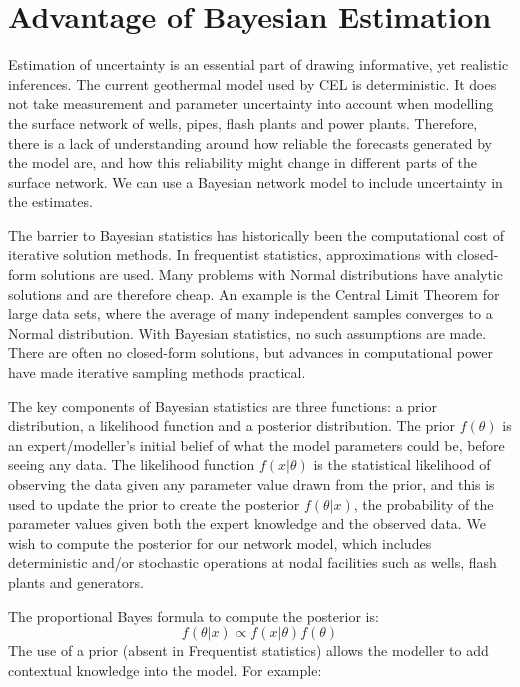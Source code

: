 \documentclass[a4paper, 12pt]{article}
\begin{document}
\section{Advantage of Bayesian Estimation}
Estimation of uncertainty is an essential part of drawing informative, yet realistic inferences. The current geothermal model used by CEL is deterministic. It does not take  measurement and parameter uncertainty into account when modelling the surface network of wells, pipes, flash plants and power plants. Therefore, there is a lack of understanding around how reliable the forecasts generated by the model are, and how this reliability might change in different parts of the surface network. We can use a Bayesian network model to include uncertainty in the estimates.

The barrier to Bayesian statistics has historically been the computational cost of iterative solution methods. In frequentist statistics, approximations with closed-form solutions are used. Many problems with Normal distributions have analytic solutions and are therefore cheap. An example is the Central Limit Theorem for large data sets, where the average of many independent samples converges to a Normal distribution. With Bayesian statistics, no such assumptions are made. There are often no closed-form solutions, but advances in computational power have made iterative sampling methods practical.

The key components of Bayesian statistics are three functions: a prior distribution, a likelihood function and a posterior distribution. The prior $f(\theta)$ is an expert/modeller's initial belief of what the model parameters could be, before seeing any data. The likelihood function $f(x|\theta)$ is the statistical likelihood of observing the data given any parameter value drawn from the prior, and this is used to update the prior to create the posterior $f(\theta|x)$, the probability of the parameter values given both the expert knowledge and the observed data. We wish to compute the posterior for our network model, which includes deterministic and/or stochastic operations at nodal facilities such as wells, flash plants and generators.

The proportional Bayes formula to compute the posterior is:
\begin{equation}
f(\theta|x) \propto f(x|\theta)f(\theta)
\end{equation}
The use of a prior (absent in Frequentist statistics) allows the modeller to add contextual knowledge into the model. For example:
\end{document}
